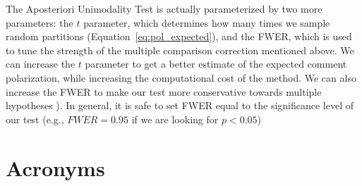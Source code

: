 \documentclass{article}
\begin{document}
The Aposteriori Unimodality Test is actually parameterized by two more parameters: the $t$ parameter, which determines how many times we sample random partitions (Equation~\ref{eq:pol_expected}), and the \ac{FWER}, which is used to tune the strength of the multiple comparison correction mentioned above. We can increase the $t$ parameter to get a better estimate of the expected comment polarization, while increasing the computational cost of the method. We can also increase the \ac{FWER} to make our test more conservative towards multiple hypotheses \parencite{ChenFengYi2017}). In general, it is safe to set \ac{FWER} equal to the significance level of our test (e.g., $FWER = 0.95$ if we are looking for $p < 0.05$)


\section{Acronyms}

\begin{acronym}[WWW]
\end{acronym}

\printbibliography
\end{document}
